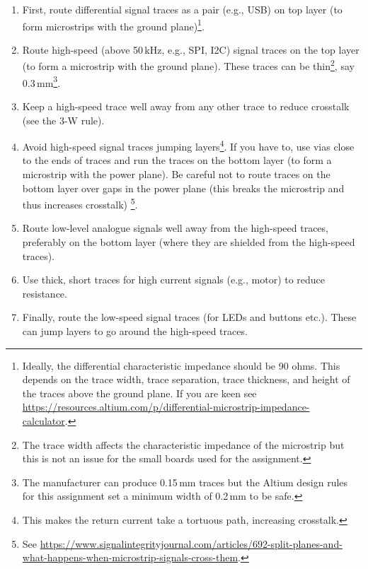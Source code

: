 \begin{enumerate}

\item First, route differential signal traces as a pair (e.g., USB) on
  top layer (to form microstrips with the ground
  plane)\footnote{Ideally, the differential characteristic impedance
    should be 90 ohms.  This depends on the trace width, trace
    separation, trace thickness, and height of the traces above the
    ground plane.  If you are keen see \url{
 https://resources.altium.com/p/differential-microstrip-impedance-calculator}.}.

\item Route high-speed (above 50\,kHz, e.g., SPI, I2C) signal traces
  on the top layer (to form a microstrip with the ground plane).
  These traces can be thin\footnote{The trace width affects the
    characteristic impedance of the microstrip but this is not an
    issue for the small boards used for the assignment.}, say
  0.3\,mm\footnote{The manufacturer can produce 0.15\,mm traces but
    the Altium design rules for this assignment set a minimum width of
    0.2\,mm to be safe.}.

\item Keep a high-speed trace well away from any other trace to reduce
  crosstalk (see the 3-W rule).

\item Avoid high-speed signal traces jumping layers\footnote{This
  makes the return current take a tortuous path, increasing
  crosstalk.}.  If you have to, use vias close to the ends of traces
  and run the traces on the bottom layer (to form a microstrip with
  the power plane).  Be careful not to route traces on the bottom
  layer over gaps in the power plane (this breaks the microstrip and
  thus increases crosstalk) \footnote{See \url{https://www.signalintegrityjournal.com/articles/692-split-planes-and-what-happens-when-microstrip-signals-cross-them}.}.

\item Route low-level analogue signals well away from the high-speed
  traces, preferably on the bottom layer (where they are shielded from
  the high-speed traces).

\item Use thick, short traces for high current signals (e.g., motor)
  to reduce resistance.

\item Finally, route the low-speed signal traces (for LEDs and buttons
  etc.).  These can jump layers to go around the high-speed traces.

\end{enumerate}

